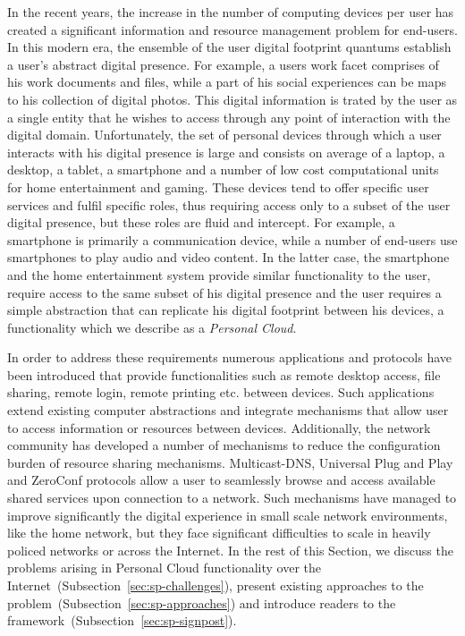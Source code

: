 In the recent years, the increase in the number of computing devices per user
has created a significant information and resource management problem for
end-users. In this modern era, the ensemble of the user digital footprint
quantums establish a user's abstract digital presence. For example, a users work
facet comprises of his work documents and files, while a part of his social
experiences can be maps to his collection of digital photos. This digital
information is trated by the user as a single entity that he wishes to access
through any point of interaction with the digital domain.  Unfortunately, the
set of personal devices through which a user interacts with his digital presence
is large and consists on average of a laptop, a desktop, a tablet, a smartphone
and a number of low cost computational units for home entertainment and gaming.
These devices tend to offer specific user services and fulfil specific roles,
thus requiring access only to a subset of the user digital presence, but these
roles are fluid and intercept. For example, a smartphone is primarily a
communication device, while a number of end-users use smartphones to play audio
and video content. In the latter case, the smartphone and the home entertainment
system provide similar functionality to the user, require access to the same
subset of his digital presence and the user requires a simple abstraction that
can replicate his digital footprint between his devices, a functionality which
we describe as a \emph{Personal Cloud}. 

In order to address these requirements numerous applications and protocols have
been introduced that provide functionalities such as remote desktop access, file
sharing, remote login, remote printing etc.  between devices.  Such applications
extend existing computer abstractions and integrate mechanisms that allow user
to access information or resources between devices.  Additionally, the network
community has developed a number of mechanisms to reduce the configuration
burden of resource sharing mechanisms.  Multicast-DNS, Universal Plug and Play
and ZeroConf protocols allow a user to seamlessly browse and access available
shared services upon connection to a network.  Such mechanisms have managed to
improve significantly the digital experience in small scale network
environments, like the home network, but they face significant difficulties to
scale in heavily policed networks or across the Internet. In the rest of this
Section, we discuss the problems arising in Personal Cloud functionality over
the Internet~(Subsection~\ref{sec:sp-challenges}), present existing approaches
to the problem~(Subsection~\ref{sec:sp-approaches}) and introduce readers to the
\signpost framework~(Subsection~\ref{sec:sp-signpost}).


